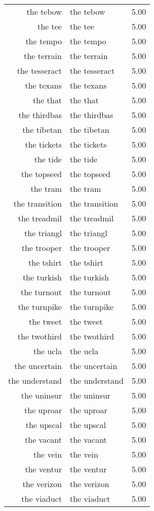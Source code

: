 \begin{table}[ht]
\begin{tabular}{rlr}
  the tebow & the tebow & 5.00 \\ 
  the tee & the tee & 5.00 \\ 
  the tempo & the tempo & 5.00 \\ 
  the terrain & the terrain & 5.00 \\ 
  the tesseract & the tesseract & 5.00 \\ 
  the texans & the texans & 5.00 \\ 
  the that & the that & 5.00 \\ 
  the thirdbas & the thirdbas & 5.00 \\ 
  the tibetan & the tibetan & 5.00 \\ 
  the tickets & the tickets & 5.00 \\ 
  the tide & the tide & 5.00 \\ 
  the topseed & the topseed & 5.00 \\ 
  the tram & the tram & 5.00 \\ 
  the transition & the transition & 5.00 \\ 
  the treadmil & the treadmil & 5.00 \\ 
  the triangl & the triangl & 5.00 \\ 
  the trooper & the trooper & 5.00 \\ 
  the tshirt & the tshirt & 5.00 \\ 
  the turkish & the turkish & 5.00 \\ 
  the turnout & the turnout & 5.00 \\ 
  the turnpike & the turnpike & 5.00 \\ 
  the tweet & the tweet & 5.00 \\ 
  the twothird & the twothird & 5.00 \\ 
  the ucla & the ucla & 5.00 \\ 
  the uncertain & the uncertain & 5.00 \\ 
  the understand & the understand & 5.00 \\ 
  the uninsur & the uninsur & 5.00 \\ 
  the uproar & the uproar & 5.00 \\ 
  the upscal & the upscal & 5.00 \\ 
  the vacant & the vacant & 5.00 \\ 
  the vein & the vein & 5.00 \\ 
  the ventur & the ventur & 5.00 \\ 
  the verizon & the verizon & 5.00 \\ 
  the viaduct & the viaduct & 5.00 \\ 

\end{tabular}
\end{table}
